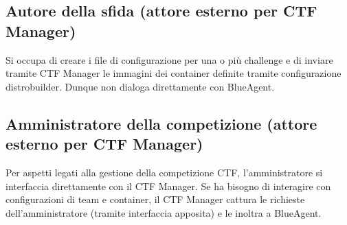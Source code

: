 \subsection{Autore della sfida (attore esterno per CTF
Manager)}\label{autore-della-sfida-attore-esterno-per-ctf-manager}

Si occupa di creare i file di configurazione per una o più challenge e
di inviare tramite CTF Manager le immagini dei container definite
tramite configurazione distrobuilder. Dunque non dialoga direttamente
con BlueAgent.

\subsection{Amministratore della competizione (attore esterno per CTF
Manager)}\label{amministratore-della-competizione-attore-esterno-per-ctf-manager}

Per aspetti legati alla gestione della competizione CTF,
l'amministratore si interfaccia direttamente con il CTF Manager. Se ha
bisogno di interagire con configurazioni di team e container, il CTF
Manager cattura le richieste dell'amministratore (tramite interfaccia
apposita) e le inoltra a BlueAgent.
